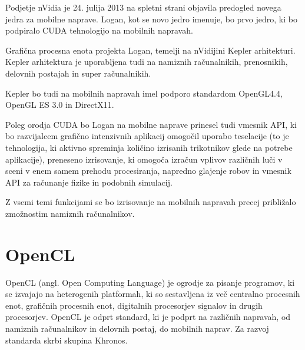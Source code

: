 


Podjetje nVidia je 24. julija 2013 \cite{cuda-mobile} na spletni strani objavila predogled novega jedra za mobilne naprave. Logan, kot se novo jedro imenuje, bo prvo jedro, ki bo podpiralo CUDA tehnologijo na mobilnih napravah.

Grafična procesna enota projekta Logan, temelji na nVidijini Kepler arhitekturi. Kepler arhitektura je uporabljena tudi na namiznih računalnikih, prenosnikih, delovnih postajah in super računalnikih.

Kepler bo tudi na mobilnih napravah imel podporo standardom OpenGL4.4, OpenGL ES 3.0 in DirectX11.

Poleg orodja CUDA bo Logan na mobilne naprave prinesel tudi vmesnik API, ki bo razvijalcem grafično intenzivnih aplikacij omogočil uporabo teselacije (to je tehnologija, ki aktivno spreminja količino izrisanih trikotnikov glede na potrebe aplikacije), preneseno izrisovanje, ki omogoča izračun vplivov različnih luči v sceni v enem samem prehodu procesiranja, napredno glajenje robov in vmesnik API za računanje fizike in podobnih simulacij.

Z vsemi temi funkcijami se bo izrisovanje na mobilnih napravah precej približalo zmožnostim namiznih računalnikov. 
 

\section{OpenCL}

OpenCL (angl. Open Computing Language) \cite{opencl} je ogrodje za pisanje programov, ki se izvajajo na heterogenih platformah, ki so sestavljena iz več centralno procesnih enot, grafičnih procesnih enot, digitalnih procesorjev signalov in drugih procesorjev. OpenCL je odprt standard, ki je podprt na različnih napravah, od namiznih računalnikov in delovnih postaj, do mobilnih naprav. Za razvoj standarda skrbi skupina Khronos.

